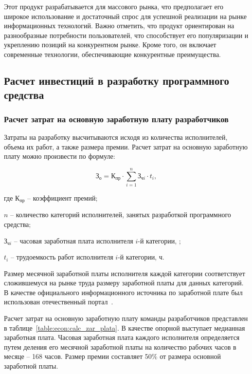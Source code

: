 Этот продукт разрабатывается для массового рынка, что предполагает его широкое использование и достаточный спрос для успешной реализации на рынке информационных технологий. Важно отметить, что продукт ориентирован на разнообразные потребности пользователей, что способствует его популяризации и укреплению позиций на конкурентном рынке. Кроме того, он включает современные технологии, обеспечивающие конкурентные преимущества.

\subsection{Расчет инвестиций в разработку программного средства}

\subsubsection{Расчет затрат на основную заработную плату разработчиков}

Затраты на разработку высчитываются исходя из количества исполнителей, объема их
работ, а также размера премии. Расчет затрат на основную заработную плату можно
произвести по формуле:

\begin{equation}
  \label{eq:econ:Zo}
  \text{З}_\text{о} = \text{К}_\text{пр} \cdot
    \sum_{i = 1}^{n} \text{З}_{\text{ч}i} \cdot t_i,
\end{equation}
\begin{explanationx}
  \item[где] $ \text{К}_\text{пр} $ -- коэффициент премий;
  \item $ n $ -- количество категорий исполнителей, занятых разработкой
  программного средства;
  \item $ \text{З}_{\text{ч}i} $ -- часовая заработная плата исполнителя $ i $-й категории, \rub;
  \item $ t_i $ -- трудоемкость работ исполнителя $ i $-й категории, ч.
\end{explanationx}

Размер месячной заработной платы исполнителя каждой категории соответствует сложившемуся на рынке труда размеру заработной платы для данных категорий. В качестве официального информационного источника по заработной плате был использован отечественный портал~\cite{salary_rb}.

Расчет затрат на основную заработную плату команды разработчиков представлен в таблице~\ref{table:econ:calc_zar_plata}. В качестве опорной выступает медианная заработная плата. Часовая заработная плата каждого исполнителя определяется путем деления его месячной заработной платы на количество рабочих часов в месяце – 168 часов. Размер премии составляет 50\% от размера основной заработной платы.

